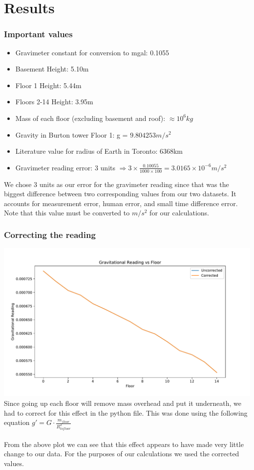 \documentclass[a4paper, 11pt]{article}
\begin{document}
\section*{Results}

\subsubsection*{Important values}
\begin{itemize}
\item Gravimeter constant for conversion to mgal: 0.1055
\item Basement Height: 5.10m
\item Floor 1 Height: 5.44m
\item Floors 2-14 Height: 3.95m
\item Mass of each floor (excluding basement and roof): $\approx 10^{6}kg$
\item Gravity in Burton tower Floor 1: g = $9.804253m/s^{2}$
\item Literature value for radius of Earth in Toronto: 6368km
\item Gravimeter reading error: 3 units $\Rightarrow 3\times\frac{0.10055}{1000\times100} = 3.0165\times10^{-6}m/s^2$
\end{itemize}

We chose 3 units as our error for the gravimeter reading since that was the biggest difference between two corresponding values from our two datasets. It accounts for measurement error, human error, and small time difference error. Note that this value must be converted to $m/s^2$ for our calculations.


\subsubsection*{Correcting the reading}
\includegraphics[width=\textwidth]{gravity-floor.pdf}
\\
Since going up each floor will remove mass overhead and put it underneath, we had to correct for this effect in the python file. This was done using the following equation $g' = G\cdot\frac{m_{floor}}{R^2_{to floor}}$ \\
\\
From the above plot we can see that this effect appears to have made very little change to our data. For the purposes of our calculations we used the corrected values.
\end{document}
